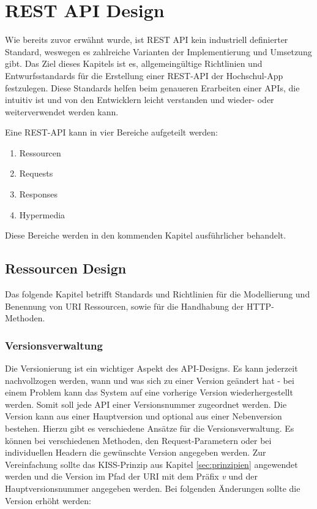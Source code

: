\chapter{REST API Design}
\label{sec:ms}
Wie bereits zuvor erwähnt wurde, ist \ac{REST} \ac{API} kein industriell definierter Standard, weswegen es zahlreiche Varianten der Implementierung und Umsetzung gibt. Das Ziel dieses Kapitels ist es, allgemeingültige Richtlinien und Entwurfsstandards für die Erstellung einer \ac{REST}-\ac{API} der Hochschul-\ac{App} festzulegen. Diese Standards helfen beim genaueren Erarbeiten einer \acp{API}, die intuitiv ist und von den Entwicklern leicht verstanden und wieder- oder weiterverwendet werden kann.
\\
\linebreak

Eine \ac{REST}-\ac{API} kann in vier Bereiche aufgeteilt werden:

\begin{enumerate}
\item Ressourcen
\item Requests
\item Responses
\item Hypermedia
\end{enumerate}

Diese Bereiche werden in den kommenden Kapitel ausführlicher behandelt.

\section{Ressourcen Design}

Das folgende Kapitel betrifft Standards und Richtlinien für die Modellierung und Benennung von \ac{URI} Ressourcen, sowie für die Handhabung der HTTP-Methoden.

\subsection{Versionsverwaltung}

Die Versionierung ist ein wichtiger Aspekt des \ac{API}-Designs. Es kann jederzeit nachvollzogen werden, wann und was sich zu einer Version geändert hat - bei einem Problem kann das System auf eine vorherige Version wiederhergestellt werden. Somit soll jede \ac{API} einer Versionsnummer zugeordnet werden. Die Version kann aus einer Hauptversion und optional aus einer Nebenversion bestehen. Hierzu gibt es verschiedene Ansätze für die Versionsverwaltung. Es können bei verschiedenen Methoden, den Request-Parametern oder bei individuellen Headern die gewünschte Version angegeben werden. Zur Vereinfachung sollte das \ac{KISS}-Prinzip aus Kapitel \ref{sec:prinzipien} angewendet werden und die Version im Pfad der \ac{URI} mit dem Präfix \textit{v} und der Hauptversionsnummer angegeben werden. Bei folgenden Änderungen sollte die Version erhöht werden:


